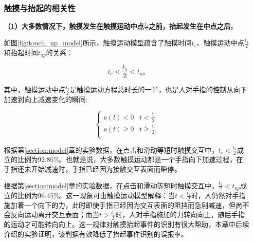 \subsubsection{触摸与抬起的相关性}

\textbf{（1）大多数情况下，触摸发生在触摸运动中点$\frac{t_1}{2}$之前，抬起发生在中点之后}。



如图\ref{fig:touch_up_model}所示，触摸运动模型蕴含了触摸时间$t_c$、触摸运动中点$\frac{t_1}{2}$和抬起时间$t_{up}$的关系：

\begin{equation}
	t_c<\frac{t_1}{2}<t_{up}
\end{equation}

其中，触摸运动中点$\frac{t_1}{2}$是触摸运动方程总时长的一半，也是人对手指的控制从向下加速到向上减速变化的瞬间:

\begin{equation}
	\begin{cases}
		a(t) < 0 & t < \frac{t_1}{2} \\
		a(t) \geq 0 & t \geq \frac{t_1}{2} \\
	\end{cases}
\end{equation}

根据第\ref{section:model}章的实验数据，在点击和滑动等短时触摸交互中，$t_c<\frac{t_1}{2}$成立的比例为92.86\%。也就是说，大多数触摸运动都是一个手指向下加速过程，在手指还未开始减速时，手指已经因为接触交互表面而瞬停。

根据第\ref{section:model}章的实验数据，在点击和滑动等短时触摸交互中，$\frac{t_1}{2}<t_{up}$成立的比例为96.45\%。这一现象可由触摸运动模型解释：当$t<\frac{t_1}{2}$时，人仍然对手指施加着一个向下的力，此时即使手指已经因为交互表面的阻挡而急剧减速，但尚不会反向运动离开交互表面；而当$t>\frac{t_1}{2}$时，人对手指施加的力转向向上，随后手指的运动才可能转向向上。这一规律对触摸抬起事件的识别有很大帮助，本章中后续介绍的实验证明，该判据有效降低了抬起事件识别的误报率。

